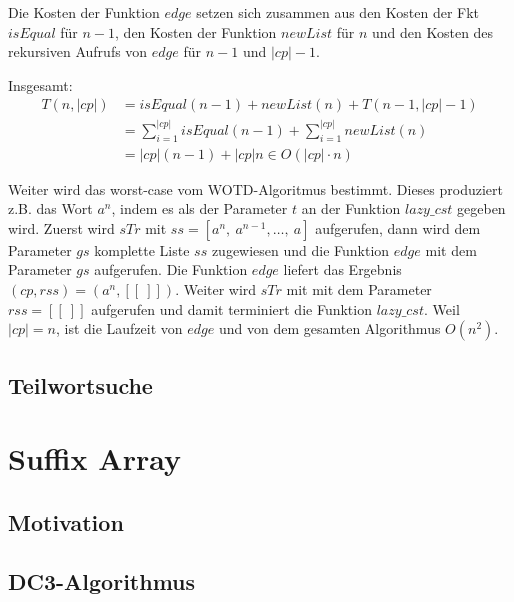 \documentclass[12pt]{report}
\newcommand{\abs}[1]{\left|#1\right|}
\begin{document}
Die Kosten der Funktion $edge$ setzen sich zusammen aus den Kosten der Fkt $isEqual$ für $n - 1$, den Kosten der Funktion $newList$ für $n$ und den Kosten des rekursiven Aufrufs von $edge$ für $n - 1$ und $\abs{cp} - 1$.

Insgesamt:
\begin{align*}
    T(n,\abs{cp}) &= isEqual(n - 1) + newList(n) + T(n-1,\abs{cp}-1) \\
                  &= \sum_{i = 1}^{\abs{cp}}{isEqual(n-1)} + \sum_{i = 1}^{\abs{cp}}{newList(n)}\\
                  &= \abs{cp} (n - 1) + \abs{cp} n \in O(\abs{cp} \cdot n)
\end{align*}

Weiter wird das worst-case vom WOTD-Algoritmus bestimmt. Dieses produziert z.B. das Wort $a^n$, indem es als der Parameter $t$ an der Funktion $lazy\_cst$ gegeben wird. Zuerst wird $sTr$ mit $ss = [a^n,\:a^{n-1}, \dots ,\:a]$ aufgerufen, dann wird dem Parameter $gs$ komplette Liste $ss$ zugewiesen und die Funktion $edge$ mit dem Parameter $gs$ aufgerufen. Die Funktion $edge$ liefert das Ergebnis $(cp,rss) = (a^n, [[\:]])$. Weiter wird $sTr$ mit mit dem Parameter $rss = [[\:]]$ aufgerufen und damit terminiert die Funktion $lazy\_cst$. Weil $|cp| = n$, ist die Laufzeit von $edge$ und von dem gesamten Algorithmus $O(n^2)$.

\section{Teilwortsuche}
\label{sec:Teilwortsuche}

\chapter{Suffix Array}
\label{sec:SuffixArray}

\section{Motivation}
\label{sec:Motivation}

\section{DC3-Algorithmus}
\label{sec:DC3Algorithmus}



\nocite{*}
\end{document}

